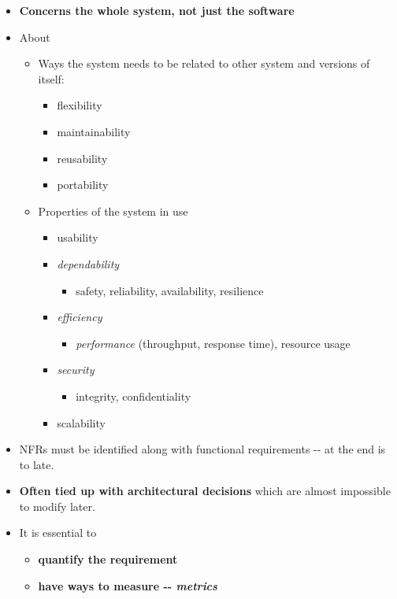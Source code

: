 \documentclass[a4paper]{article}
\providecommand{\tightlist}{%
  \setlength{\itemsep}{0pt}\setlength{\parskip}{0pt}}
\begin{document}
\begin{itemize}
\tightlist
\item
  \textbf{Concerns the whole system, not just the software}
\item
  About

  \begin{itemize}
  \tightlist
  \item
    Ways the system needs to be related to other system and versions of
    itself:

    \begin{itemize}
    \tightlist
    \item
      flexibility
    \item
      maintainability
    \item
      reusability
    \item
      portability
    \end{itemize}
  \item
    Properties of the system in use

    \begin{itemize}
    \tightlist
    \item
      usability
    \item
      \emph{dependability}

      \begin{itemize}
      \tightlist
      \item
        safety, reliability, availability, resilience
      \end{itemize}
    \item
      \emph{efficiency}

      \begin{itemize}
      \tightlist
      \item
        \emph{performance} (throughput, response time), resource usage
      \end{itemize}
    \item
      \emph{security}

      \begin{itemize}
      \tightlist
      \item
        integrity, confidentiality
      \end{itemize}
    \item
      scalability
    \end{itemize}
  \end{itemize}
\item
  NFRs must be identified along with functional requirements -\/- at the
  end is to late.
\item
  \textbf{Often tied up with architectural decisions} which are almost
  impossible to modify later.
\item
  It is essential to

  \begin{itemize}
  \tightlist
  \item
    \textbf{quantify the requirement}
  \item
    \textbf{have ways to measure -\/- \emph{metrics}}
  \end{itemize}
\end{itemize}
\end{document}
